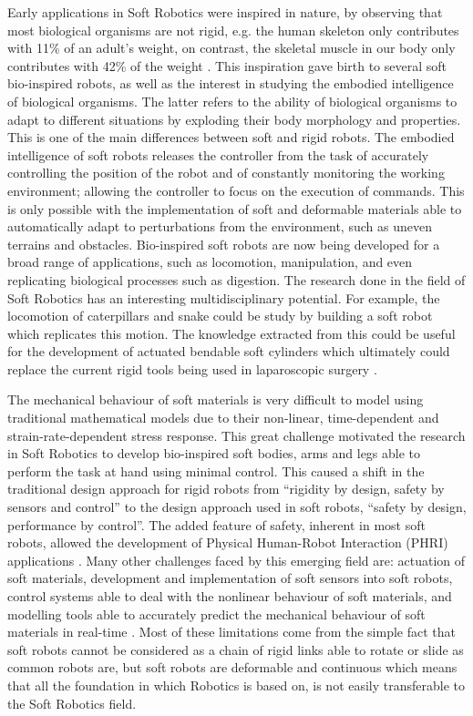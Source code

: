 Early applications in Soft Robotics were inspired in nature, by observing that most biological organisms are not rigid, e.g. the human skeleton only contributes with 11\% of an adult's weight, on contrast, the skeletal muscle in our body only contributes with 42\% of the weight \cite{kim2013soft}. This inspiration gave birth to several soft bio-inspired robots, as well as the interest in studying the embodied intelligence of biological organisms. The latter refers to the ability of biological organisms to adapt to different situations by exploding their body morphology and properties. This is one of the main differences between soft and rigid robots. The embodied intelligence of soft robots releases the controller from the task of accurately controlling the position of the robot and of constantly monitoring the working environment; allowing the controller to focus on the execution of commands. This is only possible with the implementation of soft and deformable materials able to automatically adapt to perturbations from the environment, such as uneven terrains and obstacles. Bio-inspired soft robots are now being developed for a broad range of applications, such as locomotion, manipulation, and even replicating biological processes such as digestion. The research done in the field of Soft Robotics has an interesting multidisciplinary potential. For example, the locomotion of caterpillars and snake could be study by building a soft robot which replicates this motion. The knowledge extracted from this could be useful for the development of actuated bendable soft cylinders which ultimately could replace the current rigid tools being used in laparoscopic surgery \cite{rus2015design}.

The mechanical behaviour of soft materials is very difficult to model using traditional mathematical models due to their non-linear, time-dependent and strain-rate-dependent stress response. This great challenge motivated the research in Soft Robotics to develop bio-inspired soft bodies, arms and legs able to perform the task at hand using minimal control. This caused a shift in the traditional design approach for rigid robots from ``rigidity by design, safety by sensors and control'' to the design approach used in soft robots, ``safety by design, performance by control''. The added feature of safety, inherent in most soft robots, allowed the development of Physical Human-Robot Interaction (PHRI) applications \cite{filippini2008toward}. Many other challenges faced by this emerging field are: actuation of soft materials, development and implementation of soft sensors into soft robots, control systems able to deal with the nonlinear behaviour of soft materials, and modelling tools able to accurately predict the mechanical behaviour of soft materials in real-time \cite{laschi2016soft,trivedi2008soft}. Most of these limitations come from the simple fact that soft robots cannot be considered as a chain of rigid links able to rotate or slide as common robots are, but soft robots are deformable and continuous which means that all the foundation in which Robotics is based on, is not easily transferable to the Soft Robotics field. 

